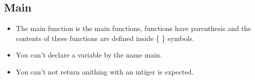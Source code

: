 \subsection{Main}
\begin{itemize}
    \item The main function is the main functions, functions have parenthesis and the contents of these functions are defined inside \{ \} symbols.
    \item You can't declare a variable by the name main.
    \item You can't not return anithing with an intiger is expected.
\end{itemize}
